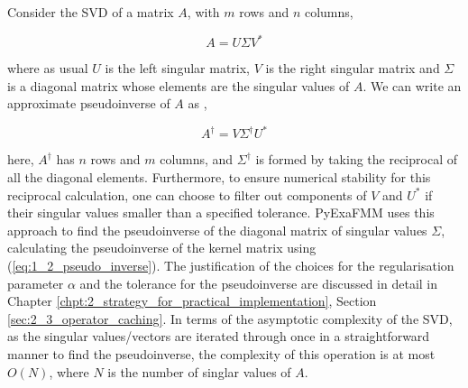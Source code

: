 Consider the SVD of a matrix $A$, with $m$ rows and $n$ columns,

\begin{equation}
    A = U \Sigma V^*
\end{equation}

where as usual $U$ is the left singular matrix, $V$ is the right singular matrix
and $\Sigma$ is a diagonal matrix whose elements are the singular values of $A$.
We can write an approximate pseudoinverse of $A$ as \cite{Trefethen:1997:SIAM},

\begin{equation}
    A^\dagger = V \Sigma^\dagger U^*
    \label{eq:1_2_pseudo_inverse}
\end{equation}

here, $A^\dagger$ has $n$ rows and $m$ columns, and $\Sigma^\dagger$ is formed
by taking the reciprocal of all the diagonal elements. Furthermore, to ensure
numerical stability for this reciprocal calculation, one can choose to filter
out components of $V$ and $U^*$ if their singular values smaller than a specified
tolerance. \gls{PyExaFMM} uses this approach to find the pseudoinverse of the
diagonal matrix of singular values $\Sigma$, calculating the pseudoinverse of
the kernel matrix using (\ref{eq:1_2_pseudo_inverse}). The justification of the choices for the regularisation parameter
$\alpha$ and the tolerance for the pseudoinverse are discussed in detail in
Chapter \ref{chpt:2_strategy_for_practical_implementation}, Section \ref{sec:2_3_operator_caching}. In terms of the asymptotic complexity of the \gls{SVD},
as the singular values/vectors are iterated through once in a straightforward
manner to find the pseudoinverse, the complexity of this operation is at most $O(N)$,
where $N$ is the number of singlar values of $A$.

